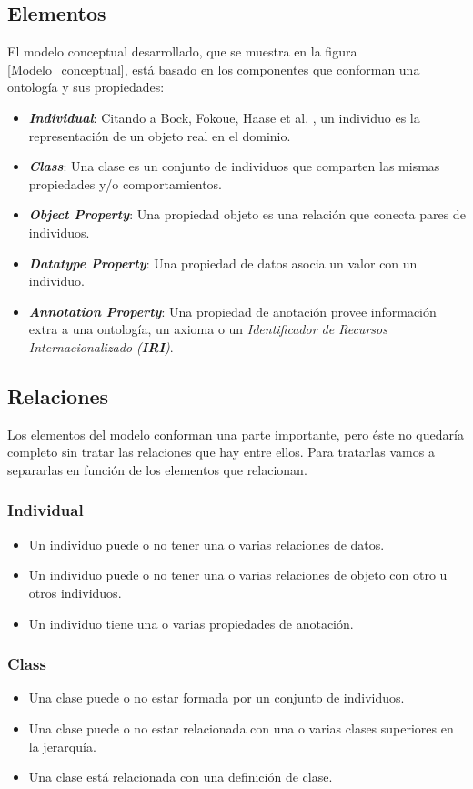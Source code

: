 \subsection{Elementos}\label{Elementos_modelo_conceptual}
El modelo conceptual desarrollado, que se muestra en la figura \ref{Modelo_conceptual}, está basado en los componentes 
que conforman una ontología y sus propiedades:
\begin{itemize}
    \item \textit{\textbf{Individual}}: Citando a Bock, Fokoue, Haase et al. \autocite*{Bock2012}, un individuo es la 
    representación de un objeto real en el dominio.
    \item \textit{\textbf{Class}}: Una clase es un conjunto de individuos que comparten las mismas propiedades y/o 
    comportamientos.
    \item \textit{\textbf{Object Property}}: Una propiedad objeto es una relación que conecta pares de individuos.
    \item \textit{\textbf{Datatype Property}}: Una propiedad de datos asocia un valor con un individuo.
    \item \textit{\textbf{Annotation Property}}: Una propiedad de anotación provee información extra a una ontología, un axioma 
    o un \textit{Identificador de Recursos Internacionalizado (\textbf{IRI})}.
\end{itemize}

\subsection{Relaciones}
Los elementos del modelo conforman una parte importante, pero éste no quedaría completo sin tratar las relaciones que hay entre 
ellos. Para tratarlas vamos a separarlas en función de los elementos que relacionan.
\subsubsection{Individual}
\begin{itemize}
    \item Un individuo puede o no tener una o varias relaciones de datos.
    \item Un individuo puede o no tener una o varias relaciones de objeto con otro u otros individuos.
    \item Un individuo tiene una o varias propiedades de anotación.
\end{itemize}

\subsubsection{Class}
\begin{itemize}
    \item Una clase puede o no estar formada por un conjunto de individuos.
    \item Una clase puede o no estar relacionada con una o varias clases superiores en la jerarquía.
    \item Una clase está relacionada con una definición de clase.
\end{itemize}

